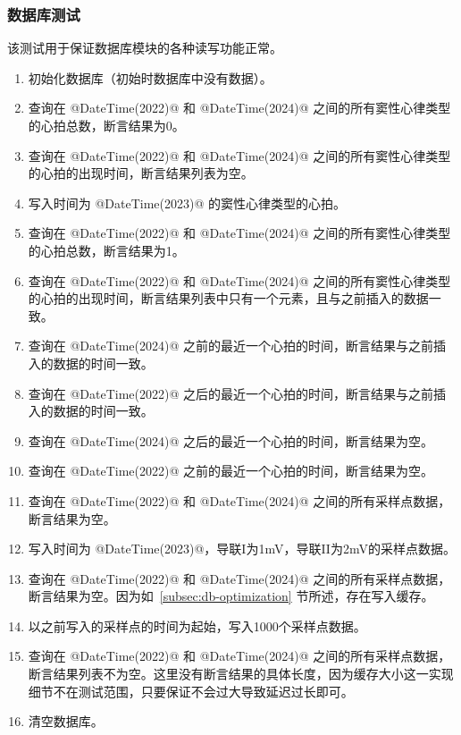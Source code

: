 \subsubsection{数据库测试}

该测试用于保证数据库模块的各种读写功能正常。

\begin{enumerate}
    \item 初始化数据库（初始时数据库中没有数据）。
    \item 查询在 @DateTime(2022)@ 和 @DateTime(2024)@ 之间的所有窦性心律类型的心拍总数，断言结果为0。
    \item 查询在 @DateTime(2022)@ 和 @DateTime(2024)@ 之间的所有窦性心律类型的心拍的出现时间，断言结果列表为空。
    \item 写入时间为 @DateTime(2023)@ 的窦性心律类型的心拍。
    \item 查询在 @DateTime(2022)@ 和 @DateTime(2024)@ 之间的所有窦性心律类型的心拍总数，断言结果为1。
    \item 查询在 @DateTime(2022)@ 和 @DateTime(2024)@ 之间的所有窦性心律类型的心拍的出现时间，断言结果列表中只有一个元素，且与之前插入的数据一致。
    \item 查询在 @DateTime(2024)@ 之前的最近一个心拍的时间，断言结果与之前插入的数据的时间一致。
    \item 查询在 @DateTime(2022)@ 之后的最近一个心拍的时间，断言结果与之前插入的数据的时间一致。
    \item 查询在 @DateTime(2024)@ 之后的最近一个心拍的时间，断言结果为空。
    \item 查询在 @DateTime(2022)@ 之前的最近一个心拍的时间，断言结果为空。
    \item 查询在 @DateTime(2022)@ 和 @DateTime(2024)@ 之间的所有采样点数据，断言结果为空。
    \item 写入时间为 @DateTime(2023)@，导联I为1mV，导联II为2mV的采样点数据。
    \item 查询在 @DateTime(2022)@ 和 @DateTime(2024)@ 之间的所有采样点数据，断言结果为空。因为如~\ref{subsec:db-optimization} 节所述，存在写入缓存。
    \item 以之前写入的采样点的时间为起始，写入1000个采样点数据。
    \item 查询在 @DateTime(2022)@ 和 @DateTime(2024)@ 之间的所有采样点数据，断言结果列表不为空。这里没有断言结果的具体长度，因为缓存大小这一实现细节不在测试范围，只要保证不会过大导致延迟过长即可。
    \item 清空数据库。
\end{enumerate}

